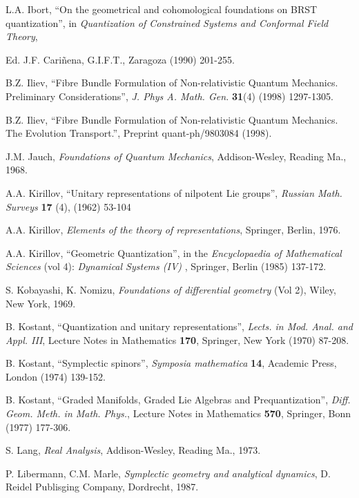 \documentclass[12pt]{article}
\begin{document}
\begin{thebibliography}{55}
{\sc L.A. Ibort},
``On the geometrical and cohomological foundations on BRST
quantization'',
in {\it Quantization of Constrained Systems and Conformal Field Theory},

Ed. J.F. Cari\~nena, G.I.F.T., Zaragoza (1990) 201-255.

{\sc B.Z. Iliev},
``Fibre Bundle Formulation of Non-relativistic Quantum Mechanics.
Preliminary Considerations'',
{\it J. Phys A. Math. Gen.} {\bf 31}(4) (1998) 1297-1305.

{\sc B.Z. Iliev},
``Fibre Bundle Formulation of Non-relativistic Quantum Mechanics.
The Evolution Transport.'',
Preprint quant-ph/9803084 (1998).

{\sc J.M. Jauch},
{\it Foundations of Quantum Mechanics},
Addison-Wesley, Reading Ma., 1968.

{\sc A.A. Kirillov},
``Unitary representations of nilpotent Lie groups'',
{\it Russian Math. Surveys\/}
{\bf 17} (4), (1962) 53-104

{\sc A.A. Kirillov},
{\it Elements of the theory of representations\/},
Springer, Berlin, 1976.

{\sc A.A. Kirillov},
``Geometric Quantization'',
in the {\it Encyclopaedia of Mathematical Sciences\/}
(vol 4): {\it Dynamical Systems (IV) \/},
Springer, Berlin (1985) 137-172.

{\sc S. Kobayashi, K. Nomizu},
{\it Foundations of differential geometry} (Vol 2),
Wiley, New York, 1969.

{\sc B. Kostant},
``Quantization and unitary representations'',
{\it Lects. in Mod. Anal. and Appl. III},
Lecture Notes in Mathematics {\bf 170}, Springer, New York (1970)
87-208.

{\sc B. Kostant},
``Symplectic spinors'',
{\it Symposia mathematica} {\bf 14}, Academic Press, London (1974)
139-152.

{\sc B. Kostant},
``Graded Manifolds, Graded Lie Algebras and Prequantization'',
{\it Diff. Geom. Meth. in Math. Phys.},
Lecture Notes in Mathematics {\bf 570}, Springer, Bonn (1977) 177-306.

{\sc S. Lang},
{\it Real Analysis},
Addison-Wesley, Reading Ma., 1973.

{\sc P. Libermann, C.M. Marle},
{\it Symplectic geometry and analytical dynamics\/},
D. Reidel Publisging Company,
Dordrecht, 1987.


\end{thebibliography}
\end{document}
